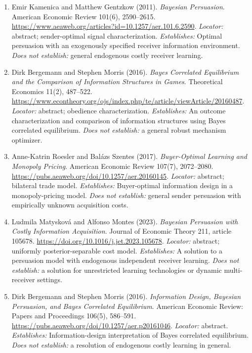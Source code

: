 \documentclass[11pt,a4paper]{article}
\begin{document}
\begin{enumerate}

\item[S1] Emir Kamenica and Matthew Gentzkow (2011). \emph{Bayesian Persuasion}. American Economic Review 101(6), 2590--2615. \url{https://www.aeaweb.org/articles?id=10.1257/aer.101.6.2590}. \textit{Locator:} abstract; sender-optimal signal characterization. \textit{Establishes:} Optimal persuasion with an exogenously specified receiver information environment. \textit{Does not establish:} general endogenous costly receiver learning.

\item[S2] Dirk Bergemann and Stephen Morris (2016). \emph{Bayes Correlated Equilibrium and the Comparison of Information Structures in Games}. Theoretical Economics 11(2), 487--522. \url{https://www.econtheory.org/ojs/index.php/te/article/viewArticle/20160487}. \textit{Locator:} abstract; obedience characterization. \textit{Establishes:} An outcome characterization and comparison of information structures using Bayes correlated equilibrium. \textit{Does not establish:} a general robust mechanism optimizer.

\item[S3] Anne-Katrin Roesler and Balázs Szentes (2017). \emph{Buyer-Optimal Learning and Monopoly Pricing}. American Economic Review 107(7), 2072--2080. \url{https://pubs.aeaweb.org/doi/10.1257/aer.20160145}. \textit{Locator:} abstract; bilateral trade model. \textit{Establishes:} Buyer-optimal information design in a monopoly-pricing model. \textit{Does not establish:} general sender persuasion with empirically unknown acquisition costs.

\item[S4] Ludmila Matysková and Alfonso Montes (2023). \emph{Bayesian Persuasion with Costly Information Acquisition}. Journal of Economic Theory 211, article 105678. \url{https://doi.org/10.1016/j.jet.2023.105678}. \textit{Locator:} abstract; uniformly posterior-separable cost model. \textit{Establishes:} A solution to a persuasion model with endogenous independent receiver learning. \textit{Does not establish:} a solution for unrestricted learning technologies or dynamic multi-receiver settings.

\item[S5] Dirk Bergemann and Stephen Morris (2016). \emph{Information Design, Bayesian Persuasion, and Bayes Correlated Equilibrium}. American Economic Review: Papers and Proceedings 106(5), 586--591. \url{https://pubs.aeaweb.org/doi/10.1257/aer.p20161046}. \textit{Locator:} abstract. \textit{Establishes:} Information-design interpretation of Bayes correlated equilibrium. \textit{Does not establish:} a resolution of endogenous costly learning in general.

\end{enumerate}
\end{document}
